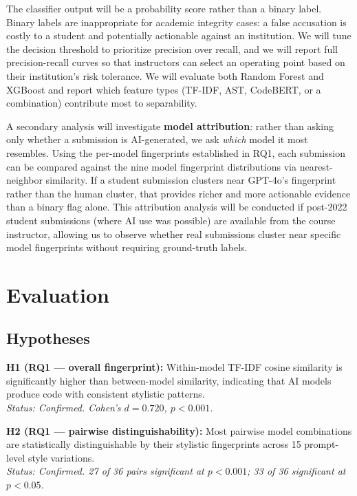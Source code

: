 \documentclass[sigconf]{acmart}
\begin{document}
The classifier output will be a probability score rather than a binary label. Binary labels are inappropriate for academic integrity cases: a false accusation is costly to a student and potentially actionable against an institution. We will tune the decision threshold to prioritize precision over recall, and we will report full precision-recall curves so that instructors can select an operating point based on their institution's risk tolerance. We will evaluate both Random Forest and XGBoost and report which feature types (TF-IDF, AST, CodeBERT, or a combination) contribute most to separability.

A secondary analysis will investigate \textbf{model attribution}: rather than asking only whether a submission is AI-generated, we ask \emph{which} model it most resembles. Using the per-model fingerprints established in RQ1, each submission can be compared against the nine model fingerprint distributions via nearest-neighbor similarity. If a student submission clusters near GPT-4o's fingerprint rather than the human cluster, that provides richer and more actionable evidence than a binary flag alone. This attribution analysis will be conducted if post-2022 student submissions (where AI use was possible) are available from the course instructor, allowing us to observe whether real submissions cluster near specific model fingerprints without requiring ground-truth labels.

\section{Evaluation}

\subsection{Hypotheses}

\textbf{H1 (RQ1 --- overall fingerprint):} Within-model TF-IDF cosine similarity is significantly higher than between-model similarity, indicating that AI models produce code with consistent stylistic patterns.\\
\textit{Status: Confirmed. Cohen's $d = 0.720$, $p < 0.001$.}

\textbf{H2 (RQ1 --- pairwise distinguishability):} Most pairwise model combinations are statistically distinguishable by their stylistic fingerprints across 15 prompt-level style variations.\\
\textit{Status: Confirmed. 27 of 36 pairs significant at $p < 0.001$; 33 of 36 significant at $p < 0.05$.}
\end{document}
